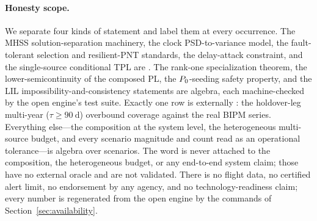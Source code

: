 \paragraph{Honesty scope.}
We separate four kinds of statement and label them at every occurrence. The MHSS
solution-separation machinery, the clock PSD-to-variance model, the fault-tolerant
selection and resilient-PNT standards, the delay-attack constraint, and the
single-source conditional TPL are \Cited{}. The rank-one specialization theorem,
the lower-semicontinuity of the composed PL, the $P_0$-seeding safety property,
and the LIL impossibility-and-consistency statements are \Proven{} algebra, each
machine-checked by the open engine's test suite. Exactly one row is externally
\Validated{}: the holdover-leg multi-year ($\tau\ge\SI{90}{\day}$) overbound
coverage against the real BIPM series. Everything else---the composition at the
system level, the heterogeneous multi-source budget, and every scenario magnitude
and count read as an operational tolerance---is \Proven{} algebra over
\Modelled{} scenarios. The word \Validated{} is never attached to the composition,
the heterogeneous budget, or any end-to-end system claim; those have no external
oracle and are not validated. There is no flight data, no certified alert limit,
no endorsement by any agency, and no technology-readiness claim; every number is
regenerated from the open engine by the commands of
Section~\ref{sec:availability}.
